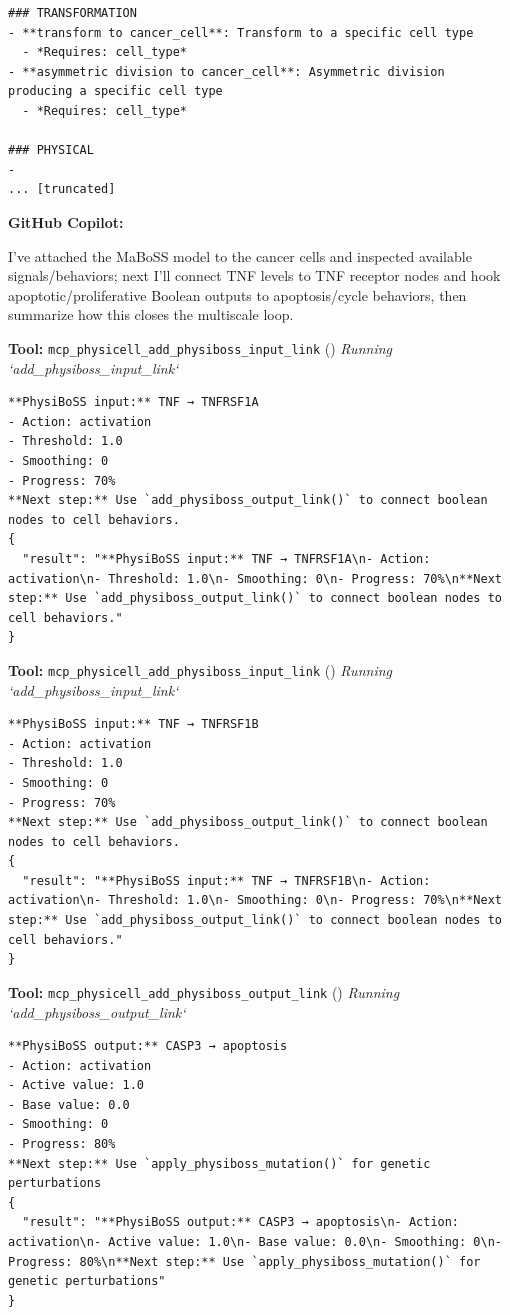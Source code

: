 \documentclass[11pt,a4paper]{article}
\begin{document}
\begin{toolokbox}
\begin{lstlisting}
### TRANSFORMATION
- **transform to cancer_cell**: Transform to a specific cell type
  - *Requires: cell_type*
- **asymmetric division to cancer_cell**: Asymmetric division producing a specific cell type
  - *Requires: cell_type*

### PHYSICAL
-
... [truncated]
\end{lstlisting}
\end{toolokbox}
\begin{copilotbox}
\textbf{GitHub Copilot:}

I've attached the MaBoSS model to the cancer cells and inspected available signals/behaviors; next I'll connect TNF levels to TNF receptor nodes and hook apoptotic/proliferative Boolean outputs to apoptosis/cycle behaviors, then summarize how this closes the multiscale loop.

\end{copilotbox}
\begin{toolokbox}
\textbf{Tool:} \texttt{mcp\_physicell\_add\_physiboss\_input\_link} (\checkmark)
\textit{Running `add\_physiboss\_input\_link`}
\begin{lstlisting}
**PhysiBoSS input:** TNF → TNFRSF1A
- Action: activation
- Threshold: 1.0
- Smoothing: 0
- Progress: 70%
**Next step:** Use `add_physiboss_output_link()` to connect boolean nodes to cell behaviors.
{
  "result": "**PhysiBoSS input:** TNF → TNFRSF1A\n- Action: activation\n- Threshold: 1.0\n- Smoothing: 0\n- Progress: 70%\n**Next step:** Use `add_physiboss_output_link()` to connect boolean nodes to cell behaviors."
}
\end{lstlisting}
\end{toolokbox}
\begin{toolokbox}
\textbf{Tool:} \texttt{mcp\_physicell\_add\_physiboss\_input\_link} (\checkmark)
\textit{Running `add\_physiboss\_input\_link`}
\begin{lstlisting}
**PhysiBoSS input:** TNF → TNFRSF1B
- Action: activation
- Threshold: 1.0
- Smoothing: 0
- Progress: 70%
**Next step:** Use `add_physiboss_output_link()` to connect boolean nodes to cell behaviors.
{
  "result": "**PhysiBoSS input:** TNF → TNFRSF1B\n- Action: activation\n- Threshold: 1.0\n- Smoothing: 0\n- Progress: 70%\n**Next step:** Use `add_physiboss_output_link()` to connect boolean nodes to cell behaviors."
}
\end{lstlisting}
\end{toolokbox}
\begin{toolokbox}
\textbf{Tool:} \texttt{mcp\_physicell\_add\_physiboss\_output\_link} (\checkmark)
\textit{Running `add\_physiboss\_output\_link`}
\begin{lstlisting}
**PhysiBoSS output:** CASP3 → apoptosis
- Action: activation
- Active value: 1.0
- Base value: 0.0
- Smoothing: 0
- Progress: 80%
**Next step:** Use `apply_physiboss_mutation()` for genetic perturbations
{
  "result": "**PhysiBoSS output:** CASP3 → apoptosis\n- Action: activation\n- Active value: 1.0\n- Base value: 0.0\n- Smoothing: 0\n- Progress: 80%\n**Next step:** Use `apply_physiboss_mutation()` for genetic perturbations"
}
\end{lstlisting}
\end{toolokbox}
\end{document}
